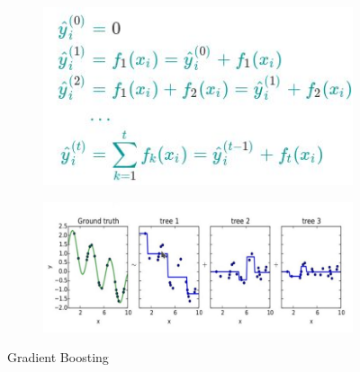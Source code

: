 \begin{figure}[ht]
	\centering
	\begin{subfigure}{.5\textwidth}
		\centering
		\includegraphics[width=1\linewidth]{figure_ml/g_b.png}
	\end{subfigure}%
	\begin{subfigure}{.5\textwidth}
		\centering
		\includegraphics[width=1\linewidth]{figure_ml/g_b2.png}
	\end{subfigure}
	\caption{Gradient Boosting}
\end{figure}


